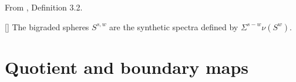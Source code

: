 \begin{definition}
\label{paper:3.2}
From \cite{LWX126}, Definition 3.2.\par

[{\cite[Definition 4.6]{Pst}}]
The bigraded spheres $S^{s,w}$ are the synthetic spectra defined by $\Sigma^{s-w}\nu (S^w)$.




\sketch
\end{definition}


\section{Quotient and boundary maps}

